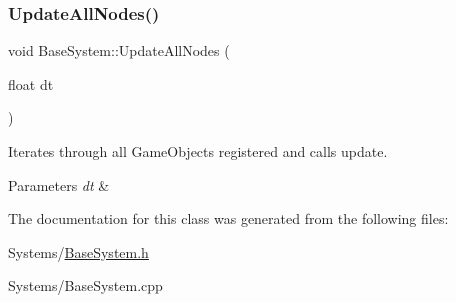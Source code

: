 \mbox{\label{classBaseSystem_a6422693fc429d74a2b0b4c4e860d1810}} 
\subsubsection{\texorpdfstring{Update\+All\+Nodes()}{UpdateAllNodes()}}
{\footnotesize\ttfamily void Base\+System\+::\+Update\+All\+Nodes (\begin{DoxyParamCaption}\item[{float}]{dt }\end{DoxyParamCaption})}



Iterates through all Game\+Objects registered and calls update. 


\begin{DoxyParams}{Parameters}
{\em dt} & \\
\hline
\end{DoxyParams}


The documentation for this class was generated from the following files\+:\begin{DoxyCompactItemize}
\item 
Systems/\hyperlink{BaseSystem_8h}{Base\+System.\+h}\item 
Systems/Base\+System.\+cpp\end{DoxyCompactItemize}
